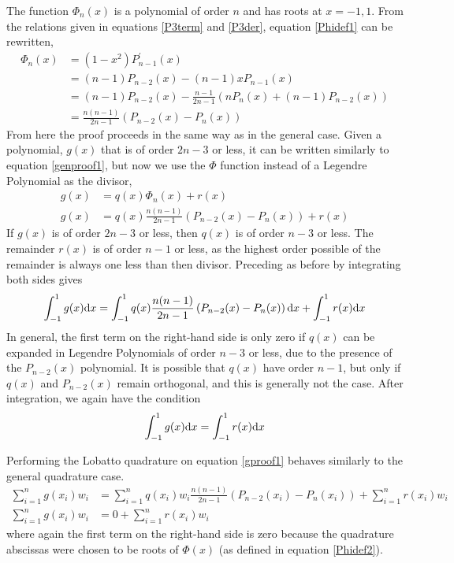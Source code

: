 \documentclass[preprint]{revtex4}
\newcommand{\dx}{{\rm d}x}
\newcommand{\intunit}{\ensuremath{\int_{-1}^{1}}}
\newcommand{\sumunit}{\ensuremath{\sum_{i=1}^{n}}}
\begin{document}
The function $\Phi_n(x)$ is a polynomial of order $n$ and has roots at $x=-1,1$. 
From the relations given in equations \ref{P3term} and \ref{P3der}, equation \ref{Phidef1}
can be rewritten, 
\begin{align}
\label{Phidef2}
\Phi_n(x)&=(1-x^2)P_{n-1}^\prime(x) \nonumber \\
&=(n-1)P_{n-2}(x)-(n-1)xP_{n-1}(x) \nonumber \\
&=(n-1)P_{n-2}(x)-\frac{n-1}{2n-1}\left(nP_n(x)+(n-1)P_{n-2}(x)\right) \nonumber \\
&=\frac{n(n-1)}{2n-1}\left(P_{n-2}(x)-P_n(x)\right)
\end{align}
From here the proof proceeds in the same way as in the general case. 
Given a polynomial, $g(x)$ that is of order $2n-3$ or less, it can be written 
similarly to equation \ref{genproof1}, but now we use the $\Phi$ function instead of 
a Legendre Polynomial as the divisor, 
\begin{align}
\label{gproof1}
g(x)&=q(x)\Phi_n(x)+r(x) \nonumber \\
g(x)&=q(x)\frac{n(n-1)}{2n-1}\left(P_{n-2}(x)-P_n(x)\right) +r(x) 
\end{align}
If $g(x)$ is of order $2n-3$ or less, then $q(x)$ is of order $n-3$ or less. The remainder
$r(x)$ is of order $n-1$ or less, as the highest order possible of the remainder is always one
less than then divisor. Preceding as before by integrating both sides gives
\begin{equation}
\label{gproof2}
\intunit g(x)\dx = \intunit q(x)\frac{n(n-1)}{2n-1}\left(P_{n-2}(x)-P_n(x)\right)\dx + \intunit r(x)\dx 
\end{equation}
In general, the first term on the right-hand side is only zero if $q(x)$ can be 
expanded in Legendre Polynomials of order $n-3$ or less, due to the presence of the
$P_{n-2}(x)$ polynomial. It is possible that $q(x)$ have order $n-1$, but only if 
$q(x)$ and $P_{n-2}(x)$ remain orthogonal, and this is generally not the case. 
After integration, we again have the condition
\begin{equation}
\label{gproof3}
\intunit g(x)\dx = \intunit r(x)\dx 
\end{equation}

Performing the Lobatto quadrature on equation \ref{gproof1} behaves similarly to the
general quadrature case. 
\begin{align}
\label{gproof4}
\sumunit g(x_i)w_i &= \sumunit q(x_i)w_i\frac{n(n-1)}{2n-1}\left(P_{n-2}(x_i)-P_n(x_i)\right) + \sumunit r(x_i)w_i \nonumber \\
\sumunit g(x_i)w_i &= 0 + \sumunit r(x_i)w_i
\end{align}
where again the first term on the right-hand side is zero because the quadrature
abscissas were chosen to be roots of $\Phi(x)$ (as defined in equation \ref{Phidef2}). 
\end{document}
